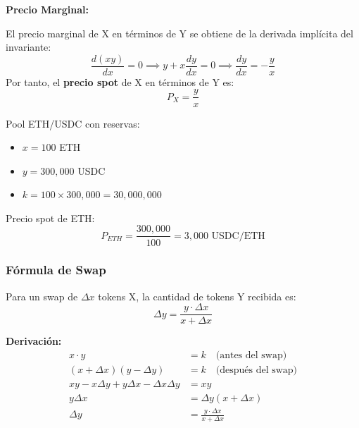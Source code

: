 \documentclass[11pt,a4paper,twoside]{book}
\begin{document}
\begin{mathnote}
\textbf{Precio Marginal:}

El precio marginal de X en t\'erminos de Y se obtiene de la derivada impl\'icita del invariante:
\[
\frac{d(xy)}{dx} = 0 \implies y + x\frac{dy}{dx} = 0 \implies \frac{dy}{dx} = -\frac{y}{x}
\]
Por tanto, el \textbf{precio spot} de X en t\'erminos de Y es:
\[
P_X = \frac{y}{x}
\]
\end{mathnote}

\begin{example}
Pool ETH/USDC con reservas:
\begin{itemize}
    \item $x = 100$ ETH
    \item $y = 300,000$ USDC
    \item $k = 100 \times 300,000 = 30,000,000$
\end{itemize}

Precio spot de ETH:
\[
P_{ETH} = \frac{300,000}{100} = 3,000 \text{ USDC/ETH}
\]
\end{example}

\subsubsection{F\'ormula de Swap}

\begin{definition}
Para un swap de $\Delta x$ tokens X, la cantidad de tokens Y recibida es:
\[
\Delta y = \frac{y \cdot \Delta x}{x + \Delta x}
\]

\textbf{Derivaci\'on:}
\begin{align}
x \cdot y &= k \quad \text{(antes del swap)} \\
(x + \Delta x)(y - \Delta y) &= k \quad \text{(despu\'es del swap)} \\
xy - x\Delta y + y\Delta x - \Delta x \Delta y &= xy \\
y\Delta x &= \Delta y(x + \Delta x) \\
\Delta y &= \frac{y \cdot \Delta x}{x + \Delta x}
\end{align}
\end{definition}
\end{document}
